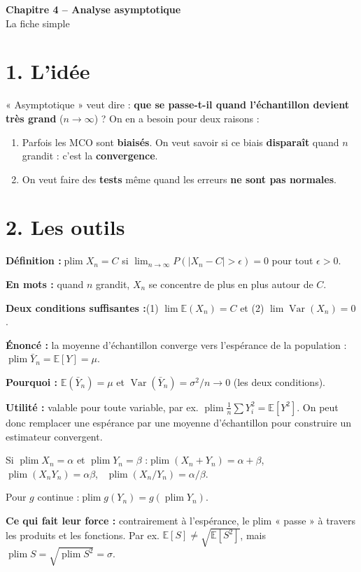\documentclass[12pt,a4paper]{article}
\newcommand{\E}{\mathbb{E}}\newcommand{\Var}{\operatorname{Var}}\newcommand{\plim}{\operatorname{plim}}
\begin{document}
\begin{center}
{\LARGE\bfseries Chapitre 4 -- Analyse asymptotique}\\[4pt]
{\large La fiche simple}
\end{center}

\section*{1. L'idée}

« Asymptotique » veut dire : \textbf{que se passe-t-il quand l'échantillon devient très grand} ($n\to\infty$) ? On en a besoin pour deux raisons :
\begin{enumerate}
\item Parfois les MCO sont \textbf{biaisés}. On veut savoir si ce biais \textbf{disparaît} quand $n$ grandit : c'est la \textbf{convergence}.
\item On veut faire des \textbf{tests} même quand les erreurs \textbf{ne sont pas normales}.
\end{enumerate}

\section*{2. Les outils}

\begin{outil}[title={Convergence en probabilité (plim)}]
\textbf{Définition :}\quad $\plim X_n=C$ si $\lim_{n\to\infty}P(|X_n-C|>\epsilon)=0$ pour tout $\epsilon>0$.

\textbf{En mots :} quand $n$ grandit, $X_n$ se concentre de plus en plus autour de $C$.

\textbf{Deux conditions suffisantes :}\quad (1) $\lim\E(X_n)=C$ \quad et \quad (2) $\lim\Var(X_n)=0$.
\end{outil}

\begin{outil}[title={Loi des grands nombres}]
\textbf{Énoncé :} la moyenne d'échantillon converge vers l'espérance de la population : $\plim\bar Y_n=\E[Y]=\mu$.

\textbf{Pourquoi :} $\E(\bar Y_n)=\mu$ et $\Var(\bar Y_n)=\sigma^2/n\to0$ (les deux conditions).

\textbf{Utilité :} valable pour toute variable, par ex. $\plim\frac1n\sum Y_i^2=\E[Y^2]$. On peut donc remplacer une espérance par une moyenne d'échantillon pour construire un estimateur convergent.
\end{outil}

\begin{outil}[title={Propriétés des plim (théorème de Slutsky)}]
Si $\plim X_n=\alpha$ et $\plim Y_n=\beta$ :\quad $\plim(X_n+Y_n)=\alpha+\beta$, \ $\plim(X_nY_n)=\alpha\beta$, \ $\plim(X_n/Y_n)=\alpha/\beta$.

Pour $g$ continue :\quad $\plim g(Y_n)=g(\plim Y_n)$.

\textbf{Ce qui fait leur force :} contrairement à l'espérance, le plim « passe » à travers les produits et les fonctions. Par ex. $\E[S]\neq\sqrt{\E[S^2]}$, mais $\plim S=\sqrt{\plim S^2}=\sigma$.
\end{outil}
\end{document}
